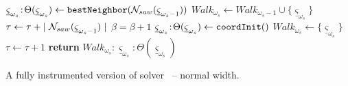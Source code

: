 \begin{algorithm}[!T]
\begin{footnotesize}
\begin{minipage}[!T]{0.49\linewidth}
\begin{algorithmic}[1]
        \STATE ${\underline \varsigma}_{\omega_{s}}\!:\!\Theta({\underline \varsigma}_{\omega_{s}}) \gets {\tt bestNeighbor}({\cal N}_{saw} ({\underline \varsigma}_{\omega_{s} -1}))$
        \STATE $Walk_{\omega_{s}} \gets Walk_{\omega_{s}-1} \cup \{{\underline \varsigma}_{\omega_{s}}\}$
        \STATE $\tau \gets \tau + |~{\cal N}_{saw} ({\underline \varsigma}_{\omega_{s} -1})~| $ 
        \STATE $\beta = \beta + 1$ 
        \STATE ${\underline \varsigma}_{\omega_{s}}\!:\!\Theta({\underline \varsigma}_{\omega_{s}}) \gets {\tt coordInit}()$ 
        \STATE $Walk_{\omega_{s}} \gets \{ {\underline \varsigma}_{\omega_{s}} \}$
        \STATE $\tau \gets \tau + 1 $ 
    \ENDIF
\STATE \textbf{return} $Walk_{\omega_{s}}\!:\!{\underline \varsigma}_{\omega_{s}}\!:\!\Theta({\underline \varsigma}_{\omega_{s}})$ 
\ENDPROCEDURE 
\end{algorithmic}
\end{minipage}
\caption[Algorithm file: alg-global-search2-normal.tex]{A fully instrumented version of solver \lssOrel\ -- normal width.} 
\label{alg-global-search2-normal}
\end{footnotesize}
\end{algorithm}